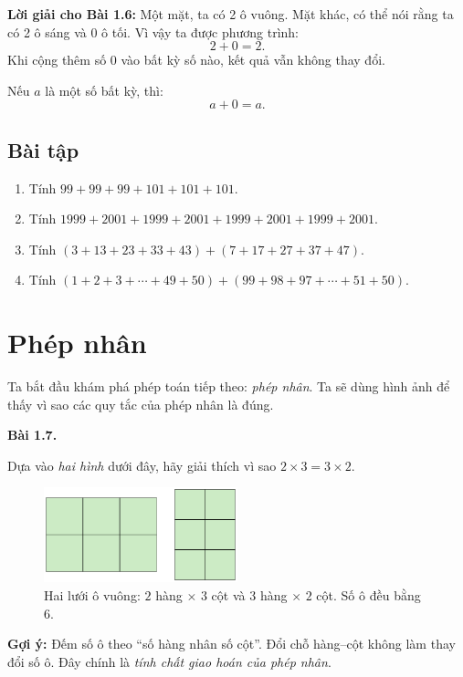 \documentclass[14pt,a4paper]{extbook}
\newenvironment{problem}[1][]{
  \par\noindent\textbf{Bài #1.}\ \ignorespaces
}{\par}
\begin{document}
\noindent\textbf{Lời giải cho Bài 1.6:}  
Một mặt, ta có 2 ô vuông.  
Mặt khác, có thể nói rằng ta có 2 ô sáng và 0 ô tối.  
Vì vậy ta được phương trình:
\[
2 + 0 = 2.
\]
Khi cộng thêm số 0 vào bất kỳ số nào, kết quả vẫn không thay đổi.

\begin{tcolorbox}[colback=yellow!10!white, colframe=orange!80!black,
title={Tính chất cộng với số không}]
Nếu \(a\) là một số bất kỳ, thì:
\[
a + 0 = a.
\]
\end{tcolorbox}

\subsection*{Bài tập}
\begin{enumerate}[label=1.2.\arabic*.]
  \item Tính \(99+99+99+101+101+101\).
  \item Tính \(1999+2001+1999+2001+1999+2001+1999+2001\).
  \item Tính \((3+13+23+33+43)+(7+17+27+37+47)\).
  \item Tính \((1+2+3+\cdots+49+50)+(99+98+97+\cdots+51+50)\).
\end{enumerate}

\section{Phép nhân}

\noindent Ta bắt đầu khám phá phép toán tiếp theo: \emph{phép nhân}.
Ta sẽ dùng hình ảnh để thấy vì sao các quy tắc của phép nhân là đúng.

\begin{problem}[1.7]
Dựa vào \emph{hai hình} dưới đây, hãy giải thích vì sao \(2\times3=3\times2\).

\begin{figure}[ht!]
  \centering
  \includegraphics[width=0.50\textwidth]{img/fig-prob1.7.pdf}
  \caption*{\small Hai lưới ô vuông: \(2\) hàng \(\times\) \(3\) cột và \(3\) hàng \(\times\) \(2\) cột.
  Số ô đều bằng \(6\).}
\end{figure}

\textbf{Gợi ý:} Đếm số ô theo “số hàng nhân số cột”. Đổi chỗ hàng–cột
không làm thay đổi số ô. Đây chính là \emph{tính chất giao hoán của phép nhân}.
\end{problem}
\end{document}
